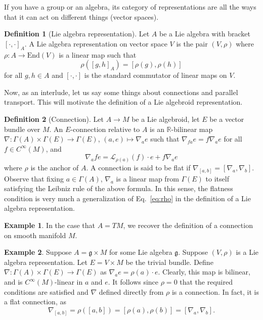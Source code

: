 \documentclass[aps,pra,showpacs,notitlepage,onecolumn,superscriptaddress,nofootinbib]{revtex4-1}
\theoremstyle{definition}
\newtheorem{definition}{Definition}[section]
\newtheorem{example}{Example}[section]
\begin{document}
\noindent If you have a group or an algebra, its category of representations are all the ways that it can act on different things (vector spaces).

\begin{definition}[Lie algebra representation]
    Let $A$ be a Lie algebra with bracket $[\cdot, \cdot]_{A}$. A Lie algebra representation on vector space $V$ is the pair $(V, \rho)$ where $\rho : A \rightarrow \text{End}(V)$ is a linear map such that 
    \begin{equation}
        \label{eq:rho}
    \rho([g, h]_A) = [\rho(g), \rho(h)]
    \end{equation}
    for all $g, h \in A$ and $[\cdot, \cdot]$ is the standard commutator of linear maps on $V$.
\end{definition}

\noindent Now, as an interlude, let us say some things about connections and parallel transport. This will motivate the definition of a Lie algebroid representation.

\begin{definition}[Connection]
    Let $A \rightarrow M$ be a Lie algebroid, let $E$ be a vector bundle over $M$. An $E$-connection relative to $A$ is an $\mathbb{R}$-bilinear map $\nabla : \Gamma(A) \times \Gamma(E) \rightarrow \Gamma(E)$, $(a, e) \mapsto \nabla_a e$
    such that $\nabla_{fa} e = f \nabla_{a} e$ for all $f \in C^{\infty}(M)$, and
    \begin{equation}
        \nabla_{a} fe = \mathcal{L}_{\rho(a)}(f) \cdot e + f \nabla_{a} e
    \end{equation}
    where $\rho$ is the anchor of $A$. A connection is said to be flat if $\nabla_{[a, b]} = [\nabla_a, \nabla_b]$. Observe that fixing $a \in \Gamma(A)$, $\nabla_a$ is a linear map from $\Gamma(E)$ to itself satisfying the Leibniz 
    rule of the above formula. In this sense, the flatness condition is very much a generalization of Eq.~\eqref{eq:rho} in the definition of a Lie algebra representation.
\end{definition}

\begin{example}
    In the case that $A = TM$, we recover the definition of a connection on smooth manifold $M$.
\end{example}

\begin{example}
    Suppose $A = \mathfrak{g} \times M$ for some Lie algebra $\mathfrak{g}$. Suppose $(V, \rho)$ is a Lie algebra representation. Let $E = V \times M$ be the trivial bundle. Define $\nabla : \Gamma(A) \times \Gamma(E) \rightarrow \Gamma(E)$
    as $\nabla_a e = \rho(a) \cdot e$. Clearly, this map is bilinear, and is $C^{\infty}(M)$-linear in $a$ and $e$. It follows since $\rho = 0$ that the required conditions are satisfied and $\nabla$ defined directly from $\rho$ is a connection. 
    In fact, it is a flat connection, as
    \begin{equation}
        \nabla_{[a, b]} = \rho([a, b]) = [\rho(a), \rho(b)] = [\nabla_a, \nabla_b].
    \end{equation}
\end{example}
\end{document}
